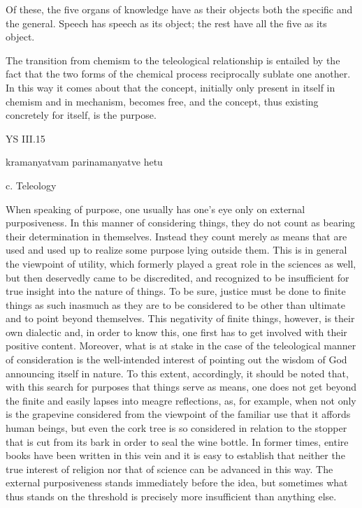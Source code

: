Of these, the five organs of knowledge have as their objects
both the specific and the general.
Speech has speech as its object;
the rest have all the five as its object.

The transition from chemism to the teleological relationship is entailed
by the fact that the two forms of the chemical process reciprocally
sublate one another.
In this way it comes about that the concept, initially only present in
itself in chemism and in mechanism, becomes free, and the concept,
thus existing concretely for itself, is the purpose.

YS III.15

kramanyatvam parinamanyatve hetu

c. Teleology

When speaking of purpose, one usually has one's eye only on external
purposiveness. In this manner of considering things, they do not count as bearing
their determination in themselves. Instead they count merely as means that are
used and used up to realize some purpose lying outside them. This is in general
the viewpoint of utility, which formerly played a great role in the sciences as well,
but then deservedly came to be discredited, and recognized to be insufficient for
true insight into the nature of things. To be sure, justice must be done to finite
things as such inasmuch as they are to be considered to be other than ultimate
and to point beyond themselves. This negativity of finite things, however, is their
own dialectic and, in order to know this, one first has to get involved with their
positive content. Moreover, what is at stake in the case of the teleological manner
of consideration is the well-intended interest of pointing out the wisdom of God
announcing itself in nature. To this extent, accordingly, it should be noted that,
with this search for purposes that things serve as means, one does not get beyond
the finite and easily lapses into meagre reflections, as, for example, when not only
is the grapevine considered from the viewpoint of the familiar use that it affords
human beings, but even the cork tree is so considered in relation to the stopper
that is cut from its bark in order to seal the wine bottle. In former times, entire
books have been written in this vein and it is easy to establish that neither the true
interest of religion nor that of science can be advanced in this way. The external
purposiveness stands immediately before the idea, but sometimes what thus stands
on the threshold is precisely more insufficient than anything else.

